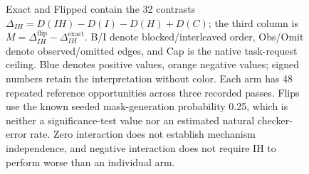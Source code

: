 \begin{figure}[t]
{Exact and Flipped contain the 32 contrasts
$\Delta_{IH}=D(IH)-D(I)-D(H)+D(C)$; the third column is
$M=\Delta_{IH}^{\mathrm{flip}}-\Delta_{IH}^{\mathrm{exact}}$.
B/I denote blocked/interleaved order, Obs/Omit denote observed/omitted edges,
and Cap is the native task-request ceiling. Blue denotes positive values, orange negative
values; signed numbers retain the interpretation without color. Each arm has
48 repeated reference opportunities across three recorded passes. Flips use
the known seeded mask-generation probability 0.25, which is neither a
significance-test value nor an estimated natural checker-error rate. Zero
interaction does not establish mechanism independence, and negative interaction
does not require IH to perform worse than an individual arm.}
\label{fig:result-interactions}
\end{figure}
